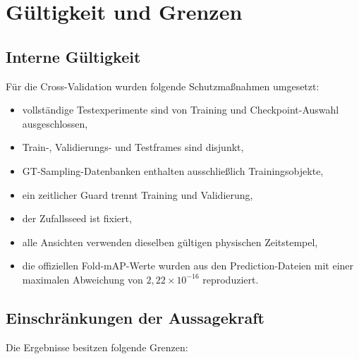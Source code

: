 \section{Gültigkeit und Grenzen}
\label{sec:gueltigkeit}

\subsection{Interne Gültigkeit}

Für die Cross-Validation wurden folgende Schutzmaßnahmen umgesetzt:

\begin{itemize}
    \item vollständige Testexperimente sind von Training und Checkpoint-Auswahl ausgeschlossen,
    \item Train-, Validierungs- und Testframes sind disjunkt,
    \item GT-Sampling-Datenbanken enthalten ausschließlich Trainingsobjekte,
    \item ein zeitlicher Guard trennt Training und Validierung,
    \item der Zufallsseed ist fixiert,
    \item alle Ansichten verwenden dieselben gültigen physischen Zeitstempel,
    \item die offiziellen Fold-mAP-Werte wurden aus den Prediction-Dateien mit einer maximalen Abweichung von \(2{,}22 \times 10^{-16}\) reproduziert.
\end{itemize}

\subsection{Einschränkungen der Aussagekraft}

Die Ergebnisse besitzen folgende Grenzen:

